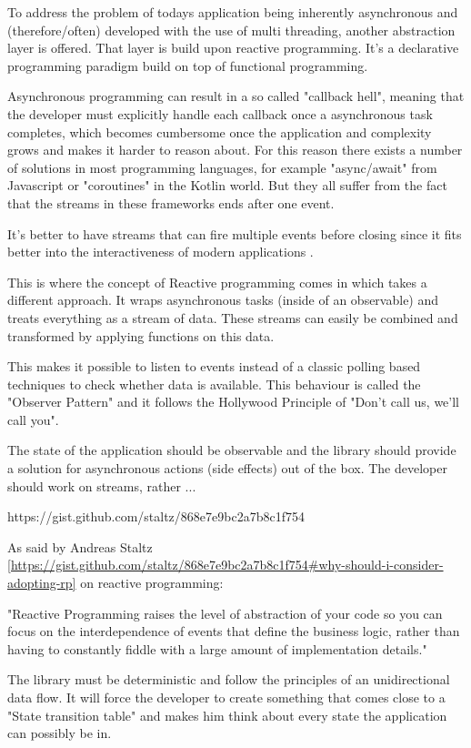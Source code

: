 To address the problem of todays application being inherently asynchronous and (therefore/often) developed 
with the use of multi threading, another abstraction layer is offered.
That layer is build upon reactive programming. It's a declarative programming paradigm
build on top of functional programming.

Asynchronous programming can result in a so called "callback hell", meaning that the developer must
explicitly handle each callback once a asynchronous task completes, which becomes cumbersome once the application 
and complexity grows and makes it harder to reason about. For this reason there exists a number of solutions
in most programming languages, for example "async/await" from Javascript or "coroutines" in the Kotlin world. 
But they all suffer from the fact that the streams in these frameworks ends after one event.

It's better to have streams that can fire multiple events before closing since it fits better into the
interactiveness of modern applications .

This is where the concept of Reactive programming comes in which takes a different approach. 
It wraps asynchronous tasks (inside of an observable) and treats everything as a stream of data.
These streams can easily be combined and transformed by applying functions on this data.

This makes it possible to listen to events instead of a classic polling based techniques to check
whether data is available. This behaviour is called the "Observer Pattern" and it follows the Hollywood Principle 
of "Don't call us, we'll call you".

The state of the application should be observable and the library should provide
a solution for asynchronous actions (side effects) out of the box. The developer
should work on streams, rather ...

https://gist.github.com/staltz/868e7e9bc2a7b8c1f754

As said by Andreas Staltz \ref{https://gist.github.com/staltz/868e7e9bc2a7b8c1f754#why-should-i-consider-adopting-rp} on
reactive programming:

"Reactive Programming raises the level of abstraction of your code so you can 
focus on the interdependence of events that define the business logic, 
rather than having to constantly fiddle with a large amount of implementation details."

The library must be deterministic and follow the principles of an unidirectional data flow. 
It will force the developer to create something that comes close to a "State transition table" and makes him 
think about every state the application can possibly be in.
